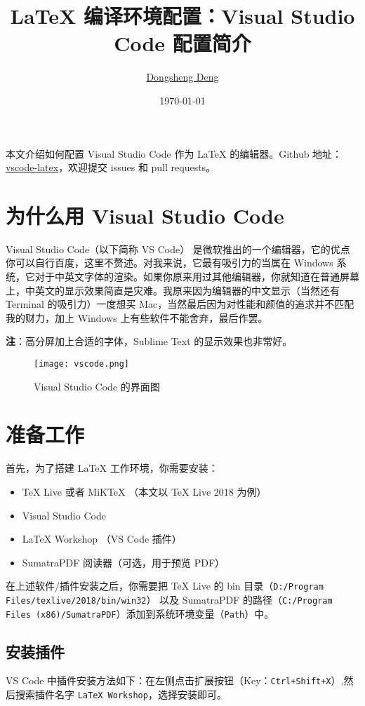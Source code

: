 \documentclass{article}
\title{\bfseries \LaTeX{} 编译环境配置：Visual Studio Code 配置简介}
\author{\href{https://ddswhu.me/}{Dongsheng Deng}}
\date{\today}
\begin{document}
\maketitle

本文介绍如何配置 Visual Studio Code 作为 \LaTeX{} 的编辑器。Github 地址：\href{https://github.com/EthanDeng/vscode-latex}{vscode-latex}，欢迎提交 issues 和 pull requests。

\section{为什么用 Visual Studio Code}
Visual Studio Code（以下简称 VS Code） 是微软推出的一个编辑器，它的优点你可以自行百度，这里不赘述。对我来说，它最有吸引力的当属在 Windows 系统，它对于中英文字体的渲染。如果你原来用过其他编辑器，你就知道在普通屏幕上，中英文的显示效果简直是灾难。我原来因为编辑器的中文显示（当然还有 Terminal 的吸引力）一度想买 Mac，当然最后因为对性能和颜值的追求并不匹配我的财力，加上 Windows 上有些软件不能舍弃，最后作罢。

\textbf{注}：高分屏加上合适的字体，Sublime Text 的显示效果也非常好。

\begin{figure}[htbp]
  \centering
  \texttt{[image: vscode.png]}
  \caption{Visual Studio Code 的界面图}
  \label{fig:vscode}
\end{figure}



\section{准备工作}
首先，为了搭建 \LaTeX{} 工作环境，你需要安装：

\begin{itemize}
  \item \TeX{} Live 或者 MiKTeX （本文以 \TeX{} Live 2018 为例）
  \item Visual Studio Code
  \item \LaTeX{} Workshop （VS Code 插件）
  \item SumatraPDF 阅读器（可选，用于预览 PDF）
\end{itemize}

在上述软件/插件安装之后，你需要把 \TeX{} Live 的 bin 目录（\texttt{D:/Program Files/texlive/2018/bin/win32}） 以及 SumatraPDF 的路径（\texttt{C:/Program Files (x86)/SumatraPDF}）添加到系统环境变量（\texttt{Path}）中。


\subsection{安装插件}
VS Code 中插件安装方法如下：在左侧点击扩展按钮（Key：\texttt{Ctrl+Shift+X}）,然后搜索插件名字 \texttt{LaTeX Workshop}，选择安装即可。
\end{document}
